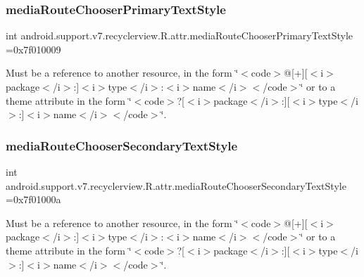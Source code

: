 \subsubsection{\texorpdfstring{media\+Route\+Chooser\+Primary\+Text\+Style}{mediaRouteChooserPrimaryTextStyle}}
{\footnotesize\ttfamily int android.\+support.\+v7.\+recyclerview.\+R.\+attr.\+media\+Route\+Chooser\+Primary\+Text\+Style =0x7f010009\hspace{0.3cm}{\ttfamily [static]}}

Must be a reference to another resource, in the form \char`\"{}$<$code$>$@\mbox{[}+\mbox{]}\mbox{[}$<$i$>$package$<$/i$>$\+:\mbox{]}$<$i$>$type$<$/i$>$\+:$<$i$>$name$<$/i$>$$<$/code$>$\char`\"{} or to a theme attribute in the form \char`\"{}$<$code$>$?\mbox{[}$<$i$>$package$<$/i$>$\+:\mbox{]}\mbox{[}$<$i$>$type$<$/i$>$\+:\mbox{]}$<$i$>$name$<$/i$>$$<$/code$>$\char`\"{}. \mbox{\label{classandroid_1_1support_1_1v7_1_1recyclerview_1_1R_1_1attr_ab001905422b96f358d74d7db57c4bcf7}} 
\subsubsection{\texorpdfstring{media\+Route\+Chooser\+Secondary\+Text\+Style}{mediaRouteChooserSecondaryTextStyle}}
{\footnotesize\ttfamily int android.\+support.\+v7.\+recyclerview.\+R.\+attr.\+media\+Route\+Chooser\+Secondary\+Text\+Style =0x7f01000a\hspace{0.3cm}{\ttfamily [static]}}

Must be a reference to another resource, in the form \char`\"{}$<$code$>$@\mbox{[}+\mbox{]}\mbox{[}$<$i$>$package$<$/i$>$\+:\mbox{]}$<$i$>$type$<$/i$>$\+:$<$i$>$name$<$/i$>$$<$/code$>$\char`\"{} or to a theme attribute in the form \char`\"{}$<$code$>$?\mbox{[}$<$i$>$package$<$/i$>$\+:\mbox{]}\mbox{[}$<$i$>$type$<$/i$>$\+:\mbox{]}$<$i$>$name$<$/i$>$$<$/code$>$\char`\"{}. \mbox{\label{classandroid_1_1support_1_1v7_1_1recyclerview_1_1R_1_1attr_af3f86f64a75718f916fba35304a25b95}} 
